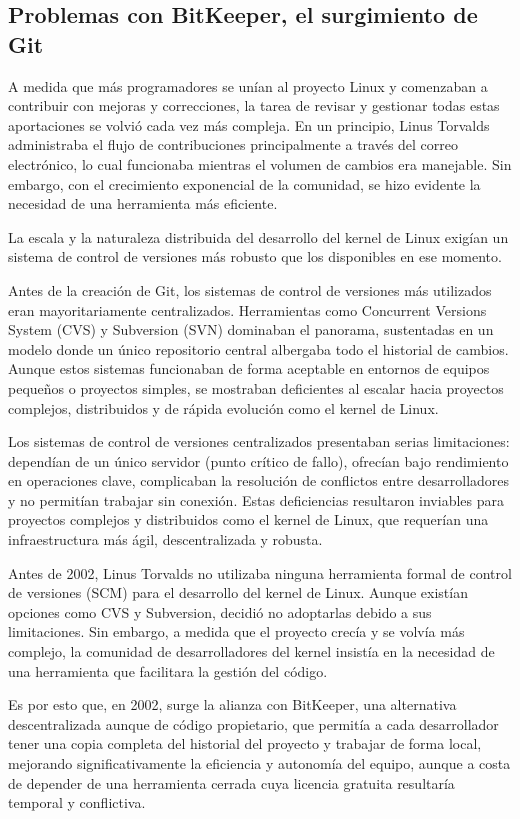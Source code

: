 \documentclass[a4paper,12pt]{article}
\begin{document}
\subsection{Problemas con BitKeeper, el surgimiento de Git}

A medida que más programadores se unían al proyecto Linux y comenzaban a
contribuir con mejoras y correcciones, la tarea de revisar y gestionar todas
estas aportaciones se volvió cada vez más compleja. En un principio, Linus
Torvalds administraba el flujo de contribuciones principalmente a través del
correo electrónico, lo cual funcionaba mientras el volumen de cambios era
manejable. Sin embargo, con el crecimiento exponencial de la comunidad, se hizo
evidente la necesidad de una herramienta más eficiente.

La escala y la naturaleza distribuida del desarrollo del kernel de Linux exigían
un sistema de control de versiones más robusto que los disponibles en ese
momento.

Antes de la creación de Git, los sistemas de control de versiones más utilizados
eran mayoritariamente centralizados. Herramientas como Concurrent Versions
System (CVS) y Subversion (SVN) dominaban el panorama, sustentadas en un modelo
donde un único repositorio central albergaba todo el historial de cambios.
Aunque estos sistemas funcionaban de forma aceptable en entornos de equipos
pequeños o proyectos simples, se mostraban deficientes al escalar hacia
proyectos complejos, distribuidos y de rápida evolución como el kernel de Linux.

Los sistemas de control de versiones centralizados presentaban serias
limitaciones: dependían de un único servidor (punto crítico de fallo), ofrecían
bajo rendimiento en operaciones clave, complicaban la resolución de conflictos
entre desarrolladores y no permitían trabajar sin conexión. Estas deficiencias
resultaron inviables para proyectos complejos y distribuidos como el kernel de
Linux, que requerían una infraestructura más ágil, descentralizada y robusta.

Antes de 2002, Linus Torvalds no utilizaba ninguna herramienta formal de control
de versiones (SCM) para el desarrollo del kernel de Linux. Aunque existían
opciones como CVS y Subversion, decidió no adoptarlas debido a sus limitaciones.
Sin embargo, a medida que el proyecto crecía y se volvía
más complejo, la comunidad de desarrolladores del kernel insistía en la
necesidad de una herramienta que facilitara la gestión del código.

Es por esto que, en 2002, surge la alianza con BitKeeper, una alternativa descentralizada
aunque de código propietario, que permitía a cada desarrollador tener una copia
completa del historial del proyecto y trabajar de forma local, mejorando
significativamente la eficiencia y autonomía del equipo, aunque a costa de
depender de una herramienta cerrada cuya licencia gratuita resultaría temporal y
conflictiva.
\end{document}
